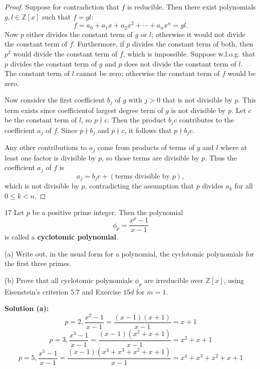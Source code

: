 \begin{proof}
    Suppose for contradiction that $f$ is reducible. Then there exist 
    polynomials $g, l \in \mathbb{Z}[x]$ such that 
    $f = g l$:
    \[
    f = a_0 + a_1 x + a_2 x^2 + \cdots +  a_n x^n = g l.
    \]
    Now $p$ either divides the constant term of $g$ or $l$;
    otherwise it would not divide the constant term of $f$.  
    Furthermore, if $p$ divides the constant term of both, then   
    $p^2$ would divide the constant term of $f$, which is impossible.  
    Suppose w.l.o.g. that $p$ divides the constant term of $g$ 
    and $p$ does not divide the constant term of $l$.  
    The constant term of $l$ cannot be zero; otherwise the constant term of $f$ would be zero.

    Now consider the first coefficient $b_j$ of $g$ with $j>0$ that is 
    not divisible by $p$. This term exists since coefficientof 
    largest degree term of $g$ is not divisible by $p$.
    Let $c$ be the constant term of $l$, so $p \nmid c$. 
    Then the product $b_j c$ contributes to the coefficient $a_j$ of $f$. 
    Since $p \nmid b_j$ and $p \nmid c$, it follows that $p \nmid b_j c$. 

    Any other contributions to $a_j$ come from products of terms of $g$ and $l$ 
        where at least one factor is divisible by $p$, so those terms are divisible by $p$. 
    Thus the coefficient $a_j$ of $f$ is
    \[
    a_j = b_j c + (\text{terms divisible by } p),
    \]
    which is not divisible by $p$, contradicting the assumption that $p$ divides $a_k$ for all $0 \le k < n$.
\end{proof}

\begin{problem}{17}
    Let $p$ be a positive prime integer. Then the polynomial
    \[\phi_p = \frac{x^p - 1}{x - 1}\]
    is called a \textbf{cyclotomic polynomial}.

    (a) Write out, in the usual form for a polynomial, the cyclotomic
        polynomials for the first three primes.

    (b) Prove that all cyclotomic polynomials $\phi_p$ are irreducible
        over $\mathbb{Z}[x]$, using Eisenstein's criterion $5.7$ 
        and Exercise $15d$ for $m = 1$.
\end{problem}
\solved

\textbf{Solution (a):}
\[p = 2, \frac{x^2 - 1}{x - 1} = \frac{(x - 1)(x + 1)}{x - 1} = x + 1\]
\[p = 3, \frac{x^3 - 1}{x - 1} = \frac{(x - 1)(x^2 + x + 1)}{x - 1} = x^2 + x + 1\]
\[p = 5, \frac{x^5 - 1}{x - 1} = \frac{(x - 1)(x^4 + x^3 + x^2 + x + 1)}{x - 1} = x^4 + x^3 + x^2 + x + 1\]

